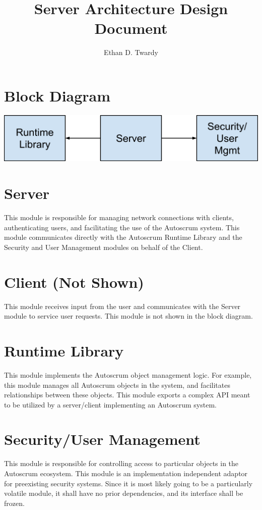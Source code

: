 \documentclass[12pt]{article}
\title{Server Architecture Design Document}
\author{Ethan D. Twardy}
\begin{document}
\maketitle
\pagebreak


\section{Block Diagram}
\includegraphics[width=\textwidth]{arch.png}

\section{Server}
This module is responsible for managing network connections with clients,
authenticating users, and facilitating the use of the Autoscrum system. This
module communicates directly with the Autoscrum Runtime Library and the
Security and User Management modules on behalf of the Client.

\section{Client (Not Shown)}
This module receives input from the user and communicates with the Server
module to service user requests. This module is not shown in the block diagram.

\section{Runtime Library}
This module implements the Autoscrum object management logic. For example, this
module manages all Autoscrum objects in the system, and facilitates
relationships between these objects. This module exports a complex API meant to
be utilized by a server/client implementing an Autoscrum system.

\section{Security/User Management}
This module is responsible for controlling access to particular objects in the
Autoscrum ecosystem. This module is an implementation independent adaptor for
preexisting security systems. Since it is most likely going to be a
particularly volatile module, it shall have no prior dependencies, and its
interface shall be frozen.
\end{document}
